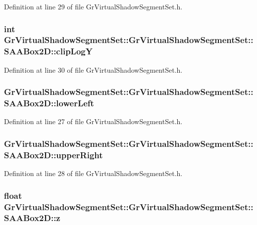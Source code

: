 Definition at line 29 of file GrVirtualShadowSegmentSet.h.\hypertarget{struct_gr_virtual_shadow_segment_set_1_1_s_a_a_box2_d_1479933b4896c9b6e86c4d54d2c02e57}{
\subsubsection[{clipLogY}]{\setlength{\rightskip}{0pt plus 5cm}int GrVirtualShadowSegmentSet::GrVirtualShadowSegmentSet::SAABox2D::clipLogY}}
\label{struct_gr_virtual_shadow_segment_set_1_1_s_a_a_box2_d_1479933b4896c9b6e86c4d54d2c02e57}




Definition at line 30 of file GrVirtualShadowSegmentSet.h.\hypertarget{struct_gr_virtual_shadow_segment_set_1_1_s_a_a_box2_d_259b18af6ce1cab1c4e3fb74efdd40e3}{
\subsubsection[{lowerLeft}]{ GrVirtualShadowSegmentSet::GrVirtualShadowSegmentSet::SAABox2D::lowerLeft}}
\label{struct_gr_virtual_shadow_segment_set_1_1_s_a_a_box2_d_259b18af6ce1cab1c4e3fb74efdd40e3}




Definition at line 27 of file GrVirtualShadowSegmentSet.h.\hypertarget{struct_gr_virtual_shadow_segment_set_1_1_s_a_a_box2_d_575507ef6de5554d267e9295adb7fe0d}{
\subsubsection[{upperRight}]{ GrVirtualShadowSegmentSet::GrVirtualShadowSegmentSet::SAABox2D::upperRight}}
\label{struct_gr_virtual_shadow_segment_set_1_1_s_a_a_box2_d_575507ef6de5554d267e9295adb7fe0d}




Definition at line 28 of file GrVirtualShadowSegmentSet.h.\hypertarget{struct_gr_virtual_shadow_segment_set_1_1_s_a_a_box2_d_910f8b178fd97b53732a64c410323f74}{
\subsubsection[{z}]{\setlength{\rightskip}{0pt plus 5cm}float {\bf GrVirtualShadowSegmentSet::GrVirtualShadowSegmentSet::SAABox2D::z}}}
\label{struct_gr_virtual_shadow_segment_set_1_1_s_a_a_box2_d_910f8b178fd97b53732a64c410323f74}




